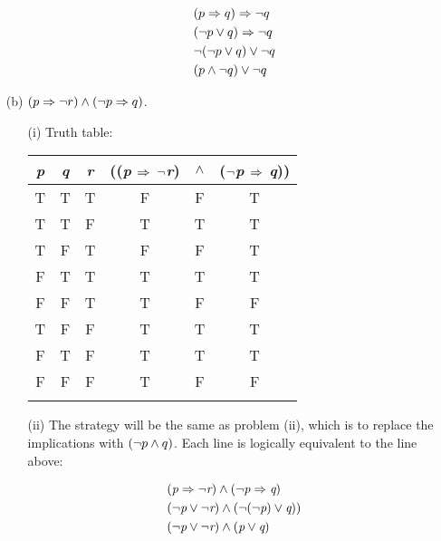 \documentclass[12pt]{article}
\begin{document}
\begin{enumerate}
\begin{enumerate}
  \begin{align*}
  &(p \Rightarrow q) \Rightarrow \neg q \\
  &(\neg p \vee q) \Rightarrow \neg q \\
  &\neg (\neg p \vee q) \vee \neg q \\
  &(p \wedge \neg q) \vee \neg q
  \end{align*}

  \end{enumerate}

\newpage

\item[(b)] $(p \Rightarrow \neg r) \wedge (\neg p \Rightarrow q)$.

  \begin{enumerate}
  \item[(i)] Truth table:

  \vspace{5pt}

  \begin{tabular}{c c c c c c}

  \emph{p} & \emph{q} & \emph{r} & ((\emph{p} $\Rightarrow$ $\neg$\emph{r}) & $\wedge$ & ($\neg$\emph{p} $\Rightarrow$ \emph{q})) \\

  \hline

  T & T & T & F & F & T \\
  T & T & F & T & T & T \\
  T & F & T & F & F & T \\
  F & T & T & T & T & T \\
  F & F & T & T & F & F \\
  T & F & F & T & T & T \\
  F & T & F & T & T & T \\
  F & F & F & T & F & F \\

  \vspace{15pt}

  \end{tabular}

  \item[(ii)] The strategy will be the same as problem (ii), which is to replace the implications with $(\neg p \wedge q)$. Each line is logically equivalent to the line above:

  \begin{align*}
  &(\emph{p} \Rightarrow \neg \emph{r}) \wedge (\neg \emph{p} \Rightarrow \emph{q}) \\
  &(\neg \emph{p} \vee \neg \emph{r}) \wedge (\neg (\neg \emph{p}) \vee \emph{q})) \\
  &(\neg \emph{p} \vee \neg \emph{r}) \wedge (\emph{p} \vee \emph{q})
  \end{align*}

  \end{enumerate}
\end{enumerate}
\end{document}
